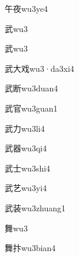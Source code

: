 \begin{verbete}[4;8]{午夜}{wu3ye4}
\end{verbete}

\begin{verbete}[8]{武}{wu3}
\end{verbete}
\begin{verbete*}[8]{武}{wu3}
\end{verbete*}

\begin{verbete*}[8;3;6]{武大戏}{wu3·da3xi4}
\end{verbete*}

\begin{verbete}[8;11]{武断}{wu3duan4}
\end{verbete}

\begin{verbete}[8;8]{武官}{wu3guan1}
\end{verbete}

\begin{verbete}[8;2]{武力}{wu3li4}
\end{verbete}

\begin{verbete}[8;16]{武器}{wu3qi4}
\end{verbete}

\begin{verbete}[8;3]{武士}{wu3shi4}
\end{verbete}

\begin{verbete}[8;4]{武艺}{wu3yi4}
\end{verbete}

\begin{verbete}[8;12]{武装}{wu3zhuang1}
\end{verbete}

\begin{verbete}[14]{舞}{wu3}
\end{verbete}

\begin{verbete}[14;7]{舞抃}{wu3bian4}
\end{verbete}

